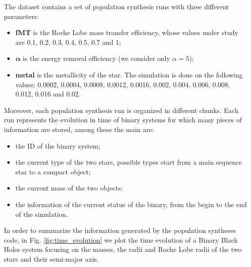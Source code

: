 \documentclass[prb,twocolumn,9pt]{revtex4-1}
\begin{document}
The dataset contains a set of population synthesis runs with three different parameters:
\begin{itemize}
    \item \textbf{fMT} is the Roche Lobe mass transfer efficiency, whose values under study are 0.1, 0.2, 0.3, 0.4, 0.5, 0.7 and 1;
    \item $\pmb{\alpha}$ is the energy removal efficiency (we consider only $\alpha=5$);
    \item \textbf{metal} is the metallicity of the star. The simulation is done on the following values: 0.0002, 0.0004, 0.0008, 0.0012, 0.0016, 0.002, 0.004, 0.006, 0.008, 0.012, 0.016 and 0.02.
\end{itemize}
Moreover, each population synthesis run is organized in different chunks. 
Each run represents the evolution in time of binary systems for which many pieces of information are stored, among these the main are:
\begin{itemize}
    \item the ID of the binary system;
    \item the current type of the two stars, possible types start from a main sequence star to a compact object;
    \item the current mass of the two objects;
    \item the information of the current status of the binary, from the begin to the end of the simulation. 
\end{itemize}

In order to summarize the information generated by the population syntheses code, in Fig. \ref{fig:time_evolution} we plot the time evolution of a Binary Black Holes system focusing on the masses, the radii and Roche Lobe radii of the two stars and their semi-major axis. 
\end{document}
